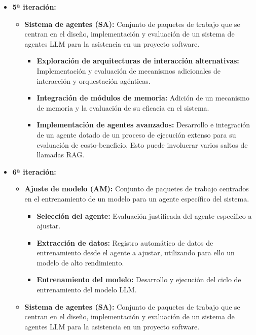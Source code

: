 \begin{itemize}
\begin{itemize}
\begin{itemize}
        \end{itemize}
    \end{itemize}
  \item\textbf{5ª iteración:}
    \begin{itemize}
      \item\textbf{Sistema de agentes (SA): }Conjunto de paquetes de trabajo que se centran en el diseño, implementación y evaluación de un sistema de agentes LLM para la asistencia en un proyecto software.
        \begin{itemize}
          \item\textbf{Exploración de arquitecturas de interacción alternativas: }Implementación y evaluación de mecanismos adicionales de interacción y orquestación agénticas.
          \item\textbf{Integración de módulos de memoria: }Adición de un mecanismo de memoria y la evaluación de su eficacia en el sistema. 
          \item\textbf{Implementación de agentes avanzados: }Desarrollo e integración de un agente dotado de un proceso de ejecución extenso para su evaluación de costo-beneficio. Esto puede involucrar varios saltos de llamadas RAG. 
        \end{itemize}
    \end{itemize}
  \item\textbf{6ª iteración:}
    \begin{itemize}
      \item\textbf{Ajuste de modelo (AM): }Conjunto de paquetes de trabajo centrados en el entrenamiento de un modelo para un agente específico del sistema.
      \begin{itemize}
        \item\textbf{Selección del agente: }Evaluación justificada del agente específico a ajustar.
        \item\textbf{Extracción de datos: }Registro automático de datos de entrenamiento desde el agente a ajustar, utilizando para ello un modelo de alto rendimiento.
        \item\textbf{Entrenamiento del modelo: }Desarrollo y ejecución del ciclo de entrenamiento del modelo LLM.
      \end{itemize}
      \item\textbf{Sistema de agentes (SA): }Conjunto de paquetes de trabajo que se centran en el diseño, implementación y evaluación de un sistema de agentes LLM para la asistencia en un proyecto software.
        \begin{itemize}

\end{itemize}
\end{itemize}
\end{itemize}
